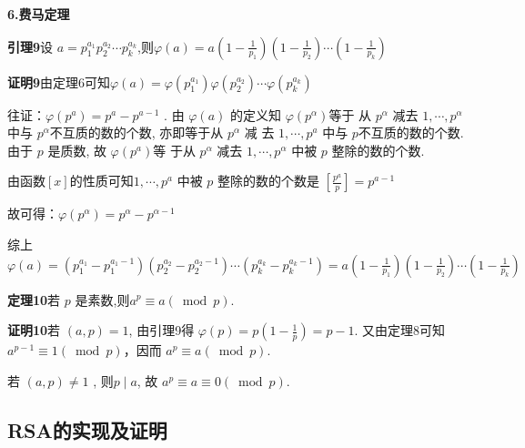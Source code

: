 \documentclass[a4paper,12pt]{article}
\begin{document}
\textbf{6.费马定理}\par

\textbf{引理9}\quad 设 $ a=p_{1}^{a_{1}} p_{2}^{a_{2}} \cdots p_{k}^{a_{k}} $,则$\varphi(a)=a\left(1-\frac{1}{p_{1}}\right)\left(1-\frac{1}{p_{2}}\right) \cdots\left(1-\frac{1}{p_{k}}\right) $\par 
\textbf{证明9}\quad 由定理6可知$\varphi(a)=\varphi\left(p_{1}^{a_{1}}\right) \varphi\left(p_{2}^{a_{2}}\right) \cdots \varphi\left(p_{k}^{a_{k}}\right)$\par 
往证：$ \varphi\left(p^{a}\right)=p^{a}-p^{a-1}$ . 由 $ \varphi(a) $ 的定义知  $\varphi\left(p^{\alpha}\right)  $等于 从 $ p^{\alpha} $ 减去  $1, \cdots, p^{\alpha} $ 中与 $ p^{\alpha}  $不互质的数的个数, 亦即等于从 $ p^{\alpha} $ 减 去 $ 1, \cdots, p^{a} $ 中与 $ p  $不互质的数的个数. 由于 $ p $ 是质数, 故  $\varphi\left(p^{a}\right)  $等 于从  $p^{\alpha}$  减去 $ 1, \cdots, p^{\alpha} $ 中被  $p $ 整除的数的个数.\par 
由函数$[x]$的性质可知$  1, \cdots, p^{a}$  中被 $ p $ 整除的数的个数是 $ \left[\frac{p^{a}}{p}\right]=p^{a-1} $\par 
故可得：$\varphi\left(p^{\alpha}\right)=p^{\alpha}-p^{\alpha-1} $\par 
综上$\varphi(a) =\left(p_{1}^{a_{1}}-p_{1}^{a_{1}-1}\right)\left(p_{2}^{a_{2}}-p_{2}^{a_{2}-1}\right) \cdots\left(p_{k}^{a_{k}}-p_{k}^{a_{k}-1}\right) =a\left(1-\frac{1}{p_{1}}\right)\left(1-\frac{1}{p_{2}}\right) \cdots\left(1-\frac{1}{p_{k}}\right) $

\textbf{定理10}\quad 若 $ p $ 是素数,则$  a^{p} \equiv a(\bmod p)$.\par 
\textbf{证明10}\quad 若 $ (a, p)=1 $, 由引理9得 $\varphi(p)=p(1-\frac{1}{p})=p-1$. 又由定理8可知 $ a^{p-1} \equiv 1(\bmod p) $，因而 $ a^{p} \equiv a(\bmod p)$. \par
若 $ (a, p) \neq 1$ , 则$  p \mid a $, 故 $ a^{p} \equiv a\equiv 0(\bmod p) $.





\subsection{RSA的实现及证明}
\end{document}
